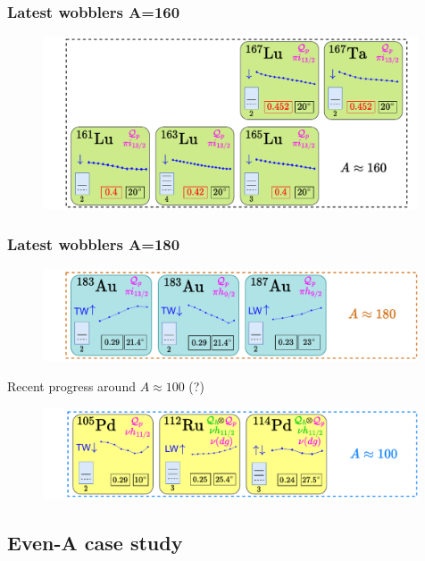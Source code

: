 \documentclass{beamer}
\begin{document}
\begin{frame}
	\frametitle{Latest wobblers A=160}
	\begin{figure}
		\centering
		\includegraphics[width=0.99\textwidth]{figures/wobblers-chart-4.pdf}
	\end{figure}
\end{frame}

\begin{frame}
	\frametitle{Latest wobblers A=180}
	\begin{figure}
		\centering
		\includegraphics[width=0.99\textwidth]{figures/wobblers-chart-3.pdf}
	\end{figure}
	Recent progress around $A\approx100$ (?)
	\begin{figure}
		\centering
		\includegraphics[width=0.99\textwidth]{figures/wobblers-chart-1.pdf}
	\end{figure}
\end{frame}

\subsection{Even-A case study}
\end{document}
